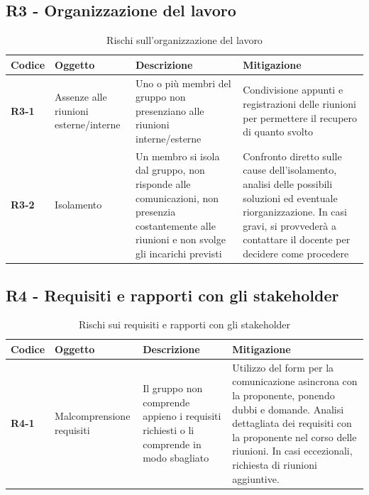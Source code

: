 \documentclass[a4paper,12pt]{article}
\begin{document}
    \subsection{R3 - Organizzazione del lavoro}
        \begin{table}[H]
        \caption{Rischi sull'organizzazione del lavoro}
        \label{tab:r3}
            \begin{tabularx}{\textwidth}{|l|L|L|L|}
            \hline
            \textbf{Codice} & \textbf{Oggetto} & \textbf{Descrizione} & \textbf{Mitigazione}\\
            \hline
            \textbf{R3-1} & Assenze alle riunioni esterne/interne & Uno o più membri del gruppo non presenziano alle riunioni interne/esterne & Condivisione appunti e registrazioni delle riunioni per permettere il recupero di quanto svolto\\
            \hline
            \textbf{R3-2} & Isolamento & Un membro si isola dal gruppo, non risponde alle comunicazioni, non presenzia costantemente alle riunioni e non svolge gli incarichi previsti & Confronto diretto sulle cause dell'isolamento, analisi delle possibili soluzioni ed eventuale riorganizzazione. In casi gravi, si provvederà a contattare il docente per decidere come procedere\\
            \hline
            \end{tabularx}
        \end{table}
        
    \subsection{R4 - Requisiti e rapporti con gli stakeholder}
        \begin{table}[H]
        \caption{Rischi sui requisiti e rapporti con gli stakeholder}
        \label{tab:r4}
            \begin{tabularx}{\textwidth}{|l|L|L|L|}
            \hline
            \textbf{Codice} & \textbf{Oggetto} & \textbf{Descrizione} & \textbf{Mitigazione}\\
            \hline
            \textbf{R4-1} & Malcomprensione requisiti & Il gruppo non comprende appieno i requisiti richiesti o li comprende in modo sbagliato & Utilizzo del form per la comunicazione asincrona con la proponente, ponendo dubbi e domande. Analisi dettagliata dei requisiti con la proponente nel corso delle riunioni. In casi eccezionali, richiesta di riunioni aggiuntive.\\
            \hline
            \end{tabularx}
        \end{table}
        
\end{document}
